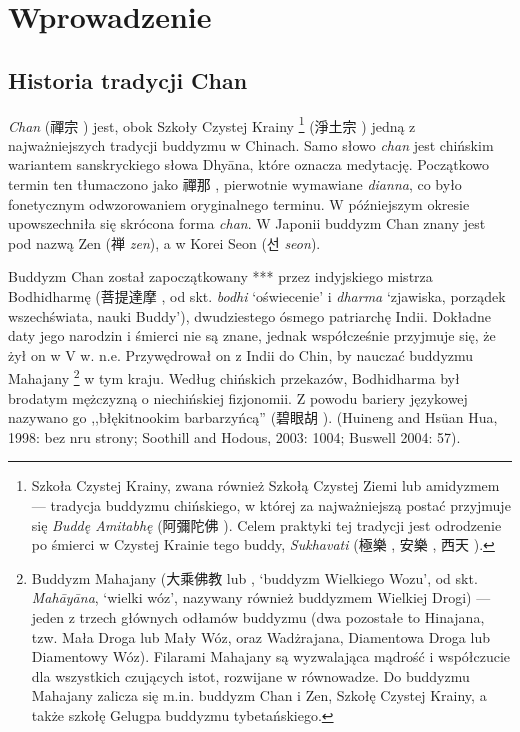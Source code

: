 \maketitle
\section{Wprowadzenie}
\subsection{Historia tradycji Chan}
\emph{Chan} (禪宗 ) jest, obok Szkoły Czystej Krainy%
\footnote{Szkoła Czystej Krainy, zwana również Szkołą Czystej Ziemi lub amidyzmem --- tradycja buddyzmu chińskiego, w której za najważniejszą postać przyjmuje się \emph{Buddę Amitabhę} (阿彌陀佛 ). Celem praktyki tej tradycji jest odrodzenie po śmierci w Czystej Krainie tego buddy, \emph{Sukhavati} (極樂 , 安樂 , 西天 ).}
(淨土宗 ) jedną z najważniejszych tradycji buddyzmu w Chinach. Samo słowo \emph{chan} jest chińskim wariantem %
sanskryckiego słowa Dhyāna, które oznacza medytację. %
Początkowo termin ten tłumaczono jako 禪那 , pierwotnie wymawiane \emph{dianna}, co było fonetycznym odwzorowaniem oryginalnego terminu. W późniejszym okresie upowszechniła się skrócona forma \emph{chan}. W Japonii buddyzm Chan znany jest pod nazwą Zen (禅 \emph{zen}), a w Korei Seon (선 \emph{seon}).

Buddyzm Chan został zapoczątkowany *** przez indyjskiego mistrza Bodhidharmę (菩提達摩 , od skt. \emph{bodhi} `oświecenie' i \emph{dharma} `zjawiska, porządek wszechświata, nauki Buddy'), dwudziestego ósmego patriarchę Indii. Dokładne daty jego narodzin i śmierci nie są znane, jednak współcześnie przyjmuje się, że żył on w V w. n.e. Przywędrował on z Indii do Chin, by nauczać buddyzmu Mahajany
\footnote{Buddyzm Mahajany (大乘佛教  lub , `buddyzm Wielkiego Wozu', od skt. \emph{Mahāyāna}, `wielki wóz', nazywany również buddyzmem Wielkiej Drogi) --- jeden z trzech głównych odłamów buddyzmu (dwa pozostałe to Hinajana, tzw. Mała Droga lub Mały Wóz, oraz Wadżrajana, Diamentowa Droga lub Diamentowy Wóz). Filarami Mahajany są wyzwalająca mądrość i współczucie dla wszystkich czujących istot, rozwijane w równowadze. Do buddyzmu Mahajany zalicza się m.in. buddyzm Chan i Zen, Szkołę Czystej Krainy, a także szkołę Gelugpa buddyzmu tybetańskiego.}
w tym kraju. Według chińskich przekazów, Bodhidharma był brodatym mężczyzną o niechińskiej fizjonomii. Z powodu bariery językowej nazywano go ,,błękitnookim barbarzyńcą'' (碧眼胡 ). (Huineng and Hsüan Hua, 1998: bez nru strony; Soothill and Hodous, 2003: 1004; Buswell 2004: 57).

